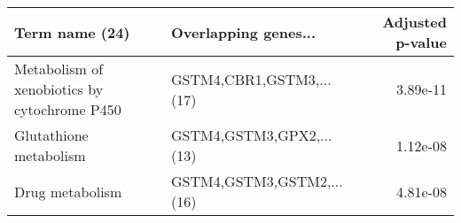 \begin{tabular}{llr}
\toprule
                              Term name (24) &      Overlapping genes... &  Adjusted p-value \\
\midrule
Metabolism of xenobiotics by cytochrome P450 &  GSTM4,CBR1,GSTM3,...(17) &          3.89e-11 \\
                      Glutathione metabolism &  GSTM4,GSTM3,GPX2,...(13) &          1.12e-08 \\
                             Drug metabolism & GSTM4,GSTM3,GSTM2,...(16) &          4.81e-08 \\
\bottomrule
\end{tabular}
